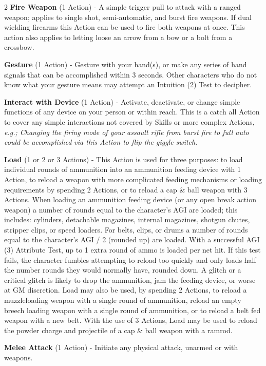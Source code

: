 \documentclass[
  oneside]{article}
\begin{document}
\begin{multicols}{2}
\textbf{Fire Weapon} (1 Action) - A simple trigger
pull to attack with a ranged weapon; applies to
single shot, semi-automatic, and burst fire
weapons. If dual wielding firearms this Action can
be used to fire both weapons at once. This action
also applies to letting loose an arrow from a bow
or a bolt from a crossbow.

\textbf{Gesture} (1 Action) - Gesture with your
hand(s), or make any series of hand signals that
can be accomplished within 3 seconds. Other
characters who do not know what your gesture means
may attempt an Intuition (2) Test to decipher.

\textbf{Interact with Device} (1 Action) -
Activate, deactivate, or change simple functions
of any device on your person or within reach. This
is a catch all Action to cover any simple
interactions not covered by Skills or more complex
Actions, \emph{e.g.; Changing the firing mode of
your assault rifle from burst fire to full auto
could be accomplished via this Action to flip the
giggle switch}.

\textbf{Load} (1 or 2 or 3 Actions) - This Action
is used for three purposes: to load individual
rounds of ammunition into an ammunition feeding
device with 1 Action, to reload a weapon with more
complicated feeding mechanisms or loading
requirements by spending 2 Actions, or to reload a
cap \& ball weapon with 3 Actions. When loading an
ammunition feeding device (or any open break
action weapon) a number of rounds equal to the
character's AGI are loaded; this includes:
cylinders, detachable magazines, internal
magazines, shotgun chutes, stripper clips, or
speed loaders. For belts, clips, or drums a number
of rounds equal to the character's AGI / 2
(rounded up) are loaded. With a successful AGI (3)
Attribute Test, up to 1 extra round of ammo is
loaded per net hit. If this test fails, the
character fumbles attempting to reload too quickly
and only loads half the number rounds they would
normally have, rounded down. A glitch or a
critical glitch is likely to drop the ammunition,
jam the feeding device, or worse at GM discretion.
Load may also be used, by spending 2 Actions, to
reload a muzzleloading weapon with a single round
of ammunition, reload an empty breech loading
weapon with a single round of ammunition, or to
reload a belt fed weapon with a new belt. With the
use of 3 Actions, Load may be used to reload the
powder charge and projectile of a cap \& ball
weapon with a ramrod.

\textbf{Melee Attack} (1 Action) - Initiate any
physical attack, unarmed or with weapons.


\end{multicols}
\end{document}
